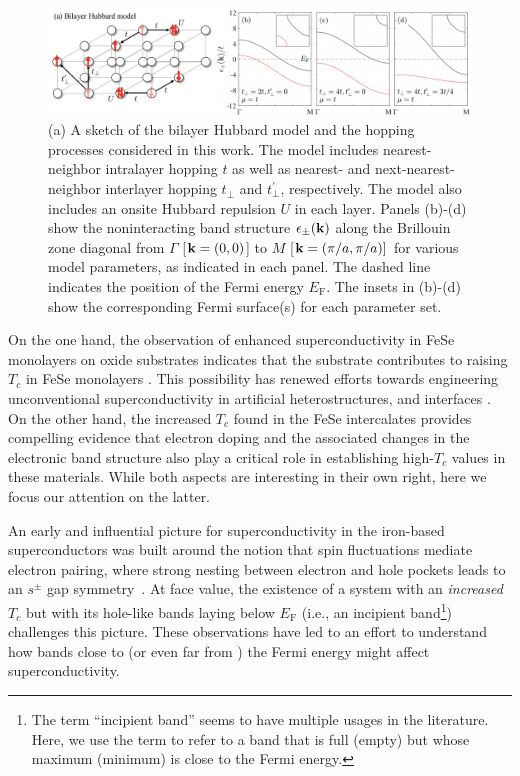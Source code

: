 \documentclass[prb,twocolumn,amsmath,amssymb,superscriptaddress,floatfix,nofootinbib]{revtex4-2}
\begin{document}
\begin{figure}[t]
    \centering
    \includegraphics[width=\textwidth]{./Bilayer_Sketch.png}
    \caption{(a) A sketch of the bilayer Hubbard model and the hopping processes considered in this work. The model includes nearest-neighbor intralayer hopping $t$ as well as nearest- and next-nearest-neighbor interlayer hopping $t^{\phantom\dagger}_\perp$ and $t^\prime_\perp$, respectively. The model also includes an onsite Hubbard repulsion $U$ in each layer. Panels (b)-(d) show the noninteracting band structure $\epsilon_\pm({\bf k})$ along the Brillouin zone diagonal from $\Gamma$ [${\bf k } = (0,0)$] to $M$ [${\bf k} = (\pi/a,\pi/a)]$ for various model parameters, as indicated in each panel. The dashed line indicates the position of the Fermi energy $E_\mathrm{F}$. The insets in (b)-(d) show the corresponding Fermi 
    surface(s) for each parameter set.}
    \label{fig:bilayer_sketch}
\end{figure}

On the one hand, the observation of enhanced superconductivity in FeSe monolayers on oxide substrates indicates that the substrate contributes to raising $T_c$ in FeSe monolayers \cite{LeeNature2014, Lee2015, Rademaker2016, SongNatureCommun2019, RademakerEnhanced2021}. This possibility has renewed efforts towards engineering unconventional superconductivity in artificial heterostructures, and interfaces \cite{LeeNature2014, CohHeterostructure, PengNatureCommun2014}. On the other hand, the increased $T_c$ found in the FeSe intercalates provides compelling evidence that electron doping and the associated changes in the electronic band structure also play a critical role in establishing high-$T_c$ values in these materials. While both aspects are interesting in their own right, here we focus our attention on the latter. 

An early and influential picture for superconductivity in the iron-based superconductors \cite{Mazin2008} was built around the notion that spin fluctuations mediate electron pairing, where strong nesting between electron and hole pockets leads to an $s^\pm$ gap symmetry~\cite{Kuroki2008, Mazin2008, Hirschfeld_2011}. At face value, the existence of a system with an \emph{increased} $T_c$ but with its hole-like bands laying below $E_\mathrm{F}$ (i.e., an incipient band\footnote{The term ``incipient band'' seems to have multiple usages in the literature. Here, we use the term to refer to a band that is full (empty) but whose maximum (minimum) is close to the Fermi energy.}) challenges this picture. These observations have led to an effort to understand how bands close to \cite{Hirschfeld_2011, PhysRevB.93.155159, PhysRevB.91.161108, BangNJP2014, ChenPRB2015, Mishra2016, LinscheidPRL2016, KurokiFlex2020, KurokiVMC2020, Maier2019, RademakerEnhanced2021} (or even far from \cite{PhysRevB.97.060501}) the Fermi energy might affect superconductivity. 
\end{document}

